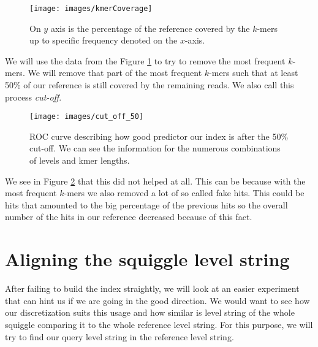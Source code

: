 \begin{figure}
\centerline{\texttt{[image: images/kmerCoverage]}}
\caption[TODO]{On $y$ axis is the percentage of the reference covered by the $k$-mers up to specific frequency
denoted on the $x$-axis.}
\label{obr:kmerCoverage}
\end{figure}

We will use the data from the Figure \ref{obr:kmerCoverage} to try to remove the
most frequent $k$-mers. We will remove that part of the most frequent $k$-mers such that
at least 50\% of our reference is still covered by the remaining reads. We also
call this process \textit{cut-off}.

\begin{figure}
\centerline{\texttt{[image: images/cut\_off\_50]}}
\caption[TODO]{ROC curve describing how good predictor our index is after the 50\% cut-off. We can see the information
for the numerous combinations of levels and kmer lengths.}
\label{obr:cut_off_50}
\end{figure}

We see in Figure \ref{obr:cut_off_50} that this did not helped at all. This can be because with the most frequent
$k$-mers we also removed a lot of so called fake hits. This could be hits that amounted to the big
percentage of the previous hits so the overall number of the hits in our reference decreased
because of this fact.

\section{Aligning the squiggle level string}
\label{section:alignMinimap}

After failing to build the index straightly, we will look at an easier experiment
that can hint us if we are going in the good direction. We would want to see how
our discretization suits this usage and how similar is level string of the whole squiggle
comparing it to the whole reference level string. For this purpose, we will try to
find our query level string in the reference level string.


